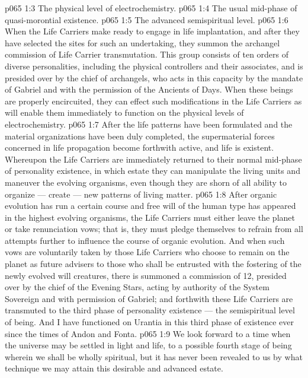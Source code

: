 \vs p065 1:3 \bibnobreakspace The physical level of electrochemistry.
\vs p065 1:4 \bibnobreakspace The usual mid\hyp{}phase of quasi\hyp{}morontial existence.
\vs p065 1:5 \bibnobreakspace The advanced semispiritual level.
\vs p065 1:6 \pc When the Life Carriers make ready to engage in life implantation, and after they have selected the sites for such an undertaking, they summon the archangel commission of Life Carrier transmutation. This group consists of ten orders of diverse personalities, including the physical controllers and their associates, and is presided over by the chief of archangels, who acts in this capacity by the mandate of Gabriel and with the permission of the Ancients of Days. When these beings are properly encircuited, they can effect such modifications in the Life Carriers as will enable them immediately to function on the physical levels of electrochemistry.
\vs p065 1:7 After the life patterns have been formulated and the material organizations have been duly completed, the supermaterial forces concerned in life propagation become forthwith active, and life is existent. Whereupon the Life Carriers are immediately returned to their normal mid\hyp{}phase of personality existence, in which estate they can manipulate the living units and maneuver the evolving organisms, even though they are shorn of all ability to organize --- create --- new patterns of living matter.
\vs p065 1:8 After organic evolution has run a certain course and free will of the human type has appeared in the highest evolving organisms, the Life Carriers must either leave the planet or take renunciation vows; that is, they must pledge themselves to refrain from all attempts further to influence the course of organic evolution. And when such vows are voluntarily taken by those Life Carriers who choose to remain on the planet as future advisers to those who shall be entrusted with the fostering of the newly evolved will creatures, there is summoned a commission of 12, presided over by the chief of the Evening Stars, acting by authority of the System Sovereign and with permission of Gabriel; and forthwith these Life Carriers are transmuted to the third phase of personality existence --- the semispiritual level of being. And I have functioned on Urantia in this third phase of existence ever since the times of Andon and Fonta.
\vs p065 1:9 We look forward to a time when the universe may be settled in light and life, to a possible fourth stage of being wherein we shall be wholly spiritual, but it has never been revealed to us by what technique we may attain this desirable and advanced estate.
